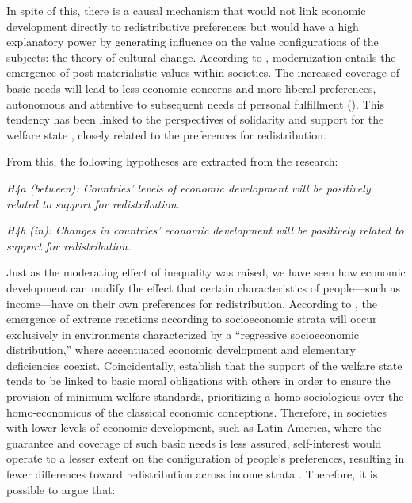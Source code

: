 \documentclass[utf8]{frontiersSCNS} %
\begin{document}
In spite of this, there is a causal mechanism that would not link economic development directly to redistributive preferences but would have a high explanatory power by generating influence on the value configurations of the subjects: the theory of cultural change. According to \textcite{InglehartLongtermtrends1977}, modernization entails the emergence of post-materialistic values within societies. The increased coverage of basic needs will lead to less economic concerns and more liberal preferences, autonomous and attentive to subsequent needs of personal fulfillment (\parencite{InglehartChangingvalueswestern2008}). This tendency has been linked to the perspectives of solidarity and support for the welfare state \parencite{GelissenPopularsupportinstitutionalised2000}, closely related to the preferences for redistribution.

From this, the following hypotheses are extracted from the research:

\textit{H4a (between): Countries’ levels of economic development will be positively related to support for redistribution.}

\textit{H4b (in): Changes in countries’ economic development will be positively related to support for redistribution.}

Just as the moderating effect of inequality was raised, we have seen how economic development can modify the effect that certain characteristics of people—such as income—have on their own preferences for redistribution. According to \textcite{ReenockRegressiveSocioeconomicDistribution2007}, the emergence of extreme reactions according to socioeconomic strata will occur exclusively in environments characterized by a “regressive socioeconomic distribution,” where accentuated economic development and elementary deficiencies coexist. Coincidentally, \textcite{BowlesReciprocityselfinterestwelfare2000} establish that the support of the welfare state tends to be linked to basic moral obligations with others in order to ensure the provision of minimum welfare standards, prioritizing a homo-sociologicus over the homo-economicus of the classical economic conceptions. Therefore, in societies with lower levels of economic development, such as Latin America, where the guarantee and coverage of such basic needs is less assured, self-interest would operate to a lesser extent on the configuration of people’s preferences, resulting in fewer differences toward redistribution across income strata \parencite{DionEconomicDevelopmentIncome2010}. Therefore, it is possible to argue that:
\end{document}
